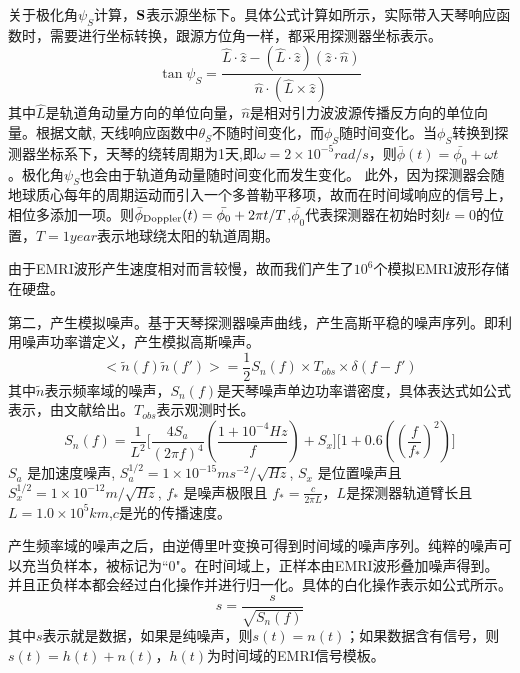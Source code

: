 关于极化角$\psi_S$计算，$\bf{S}$表示源坐标下。具体公式计算如所示，实际带入天琴响应函数时，需要进行坐标转换，跟源方位角一样，都采用探测器坐标表示。
\begin{equation}
\tan \psi_S = \frac{\hat{L} \cdot \hat{z}-(\hat{L}\cdot \hat{z})(\hat{z}\cdot \hat{n})}{\hat{n}\cdot (\hat{L}\times \hat{z})}
\end{equation}
其中$\hat{L}$是轨道角动量方向的单位向量，$\hat{n}$是相对引力波波源传播反方向的单位向量。根据文献\cite{luo2016tianqin}, 天线响应函数中$\theta_S$不随时间变化，而$\phi_S$随时间变化。当$\phi_S$转换到探测器坐标系下，天琴的绕转周期为1天,即$\omega=2\times 10^{-5} rad/s$，则$\bar{\phi}(t)=\bar{\phi_0}+\omega t$。极化角$\psi_S$也会由于轨道角动量随时间变化而发生变化。
此外，因为探测器会随地球质心每年的周期运动而引入一个多普勒平移项，故而在时间域响应的信号上，相位多添加一项。则$\bar{\phi}_{\rm Doppler} (t)=\bar{\phi_0} +2\pi t/ T$,$\bar{\phi_0}$代表探测器在初始时刻$t=0$的位置，$T=1 year$表示地球绕太阳的轨道周期。

由于EMRI波形产生速度相对而言较慢，故而我们产生了$10^6$个模拟EMRI波形存储在硬盘。

第二，产生模拟噪声。基于天琴探测器噪声曲线，产生高斯平稳的噪声序列。即利用噪声功率谱定义，产生模拟高斯噪声。
\begin{equation}
<\tilde{n}(f)\tilde{n}(f')>=\frac{1}{2}S_n(f)\times T_{obs} \times\delta(f-f')
\end{equation}
其中$\tilde{n}$表示频率域的噪声，$S_n(f)$是天琴噪声单边功率谱密度，具体表达式如公式表示，由文献\cite{luo2016tianqin}给出。$T_{obs}$表示观测时长。
\begin{equation}
S_n(f)=\frac{1}{L^2}\lbrack \frac{4S_a}{{(2\pi f)^4}} (\frac{1+10^{-4}Hz}{f}) + S_x \rbrack \lbrack 1+ 0.6((\frac{f}{f_*})^2)\rbrack
\end{equation}
$S_a$ 是加速度噪声, $S_a^{1/2}=1\times 10^{-15}m s^{-2}/\sqrt{Hz}$, $S_x$ 是位置噪声且 $S_x^{1/2}=1\times10^{-12}m/\sqrt{Hz}$, $f_*$ 是噪声极限且 $f_* =\frac{c}{2\pi L}$，$L$是探测器轨道臂长且$L=1.0\times 10^5 km$,$c$是光的传播速度。

产生频率域的噪声之后，由逆傅里叶变换可得到时间域的噪声序列。纯粹的噪声可以充当负样本，被标记为``0"。在时间域上，正样本由EMRI波形叠加噪声得到。并且正负样本都会经过白化操作并进行归一化。具体的白化操作表示如公式所示。
\begin{equation}
s = \frac{s}{\sqrt{S_n(f)}}
\end{equation}
其中$s$表示就是数据，如果是纯噪声，则$s(t)=n(t)$；如果数据含有信号，则$s(t)=h(t)+n(t)$，$h(t)$为时间域的EMRI信号模板。

